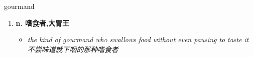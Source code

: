 
\begin{frame}
{\huge gourmand}
\begin{center}
\begin{enumerate}\Large
  \item \textbf{n. 嗜食者,大胃王}
  \begin{itemize}
    \item \em{\Large{the kind of gourmand who swallows food without even pausing to taste it 不尝味道就下咽的那种嗜食者}}
  \end{itemize}
\end{enumerate}
\end{center}
\end{frame}
